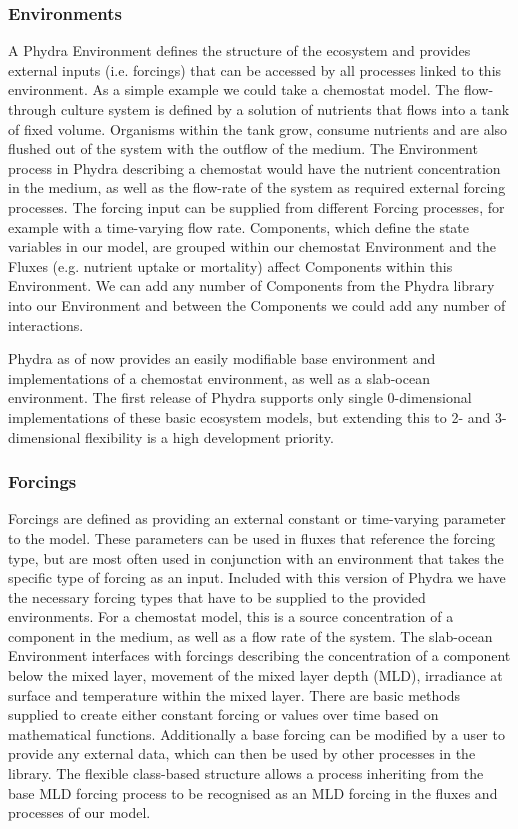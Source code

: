 \documentclass[template.tex]{subfiles}
\begin{document}
\subsubsection{Environments} \label{Section:PhysicalEnvironment}

A Phydra Environment defines the structure of the ecosystem and provides external inputs (i.e. forcings) that can be accessed by all processes linked to this environment. As a simple example we could take a chemostat model. The flow-through culture system is defined by a solution of nutrients that flows into a tank of fixed volume. Organisms within the tank grow, consume nutrients and are also flushed out of the system with the outflow of the medium. The Environment process in Phydra describing a chemostat would have the nutrient concentration in the medium, as well as the flow-rate of the system as required external forcing processes. The forcing input can be supplied from different Forcing processes, for example with a time-varying flow rate. Components, which define the state variables in our model, are grouped within our chemostat Environment and the Fluxes (e.g. nutrient uptake or mortality) affect Components within this Environment. We can add any number of Components from the Phydra library into our Environment and between the Components we could add any number of interactions.

Phydra as of now provides an easily modifiable base environment and implementations of a chemostat environment, as well as a slab-ocean environment. The first release of Phydra supports only single 0-dimensional implementations of these basic ecosystem models, but extending this to 2- and 3-dimensional flexibility is a high development priority. 

\subsubsection{Forcings} \label{Section:ForcingSection}

Forcings are defined as providing an external constant or time-varying parameter to the model. These parameters can be used in fluxes that reference the forcing type, but are most often used in conjunction with an environment that takes the specific type of forcing as an input. Included with this version of Phydra we have the necessary forcing types that have to be supplied to the provided environments. For a chemostat model, this is a source concentration of a component in the medium, as well as a flow rate of the system. The slab-ocean Environment interfaces with forcings describing the concentration of a component below the mixed layer, movement of the mixed layer depth (MLD), irradiance at surface and temperature within the mixed layer. There are basic methods supplied to create either constant forcing or values over time based on mathematical functions. Additionally a base forcing can be modified by a user to provide any external data, which can then be used by other processes in the library. The flexible class-based structure allows a process inheriting from the base MLD forcing process to be recognised as an MLD forcing in the fluxes and processes of our model.
\end{document}

